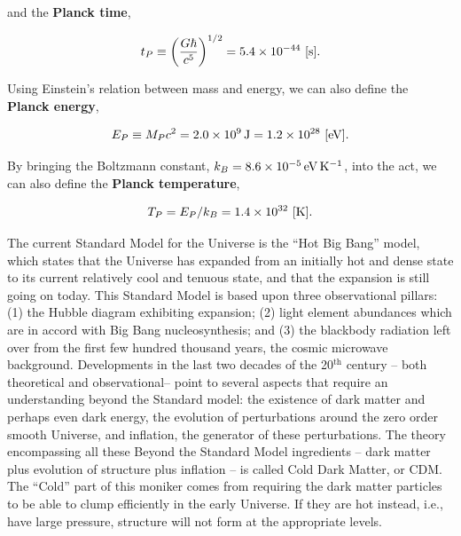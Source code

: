 \documentclass[a4paper,11pt]{article}
\begin{document}
{\noindent}and the \textbf{Planck time},

\begin{align*}
    t_P \equiv \left( \frac{G \hbar}{c^5} \right)^{1/2} = 5.4\times10^{-44} ~ [{\rm s}].
\end{align*}

{\noindent}Using Einstein's relation between mass and energy, we can also define the \textbf{Planck energy},

\begin{align*}
    E_P \equiv M_Pc^2 = 2.0\times10^9\,{\rm J} = 1.2\times10^{28} ~ [{\rm eV}].
\end{align*}

{\noindent}By bringing the Boltzmann constant, $k_B = 8.6\times10^{-5}\, {\rm eV\,K^{-1}}$, into the act, we can also define the \textbf{Planck temperature},

\begin{align*}
    T_P = E_P/k_B = 1.4\times10^{32} ~ [{\rm K}].
\end{align*}

The current Standard Model for the Universe is the ``Hot Big Bang'' model, which states that the Universe has expanded from an initially hot and dense state to its current relatively cool and tenuous state, and that the expansion is still going on today. This Standard Model is based upon three observational pillars: (1) the Hubble diagram exhibiting expansion; (2) light element abundances which are in accord with Big Bang nucleosynthesis; and (3) the blackbody radiation left over from the first few hundred thousand years, the cosmic microwave background. Developments in the last two decades of the 20$^\mathrm{th}$ century -- both theoretical and observational-- point to several aspects that require an understanding beyond the Standard model: the existence of dark matter and perhaps even dark energy, the evolution of perturbations around the zero order smooth Universe, and inflation, the generator of these perturbations. The theory encompassing all these Beyond the Standard Model ingredients -- dark matter plus evolution of structure plus inflation -- is called Cold Dark Matter, or CDM. The ``Cold'' part of this moniker comes from requiring the dark matter particles to be able to clump efficiently in the early Universe. If they are hot instead, i.e., have large pressure, structure will not form at the appropriate levels.
\end{document}
